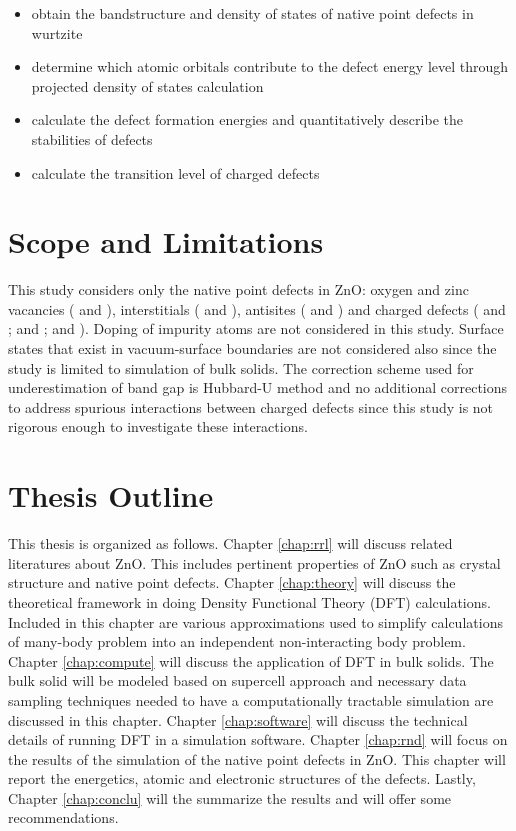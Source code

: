 \begin{itemize}
	\item obtain the bandstructure and density of states of native point defects in wurtzite 
	\item determine which atomic orbitals  contribute to the defect energy level through projected density of states calculation
	\item calculate the defect formation energies and quantitatively describe the stabilities of defects
	\item calculate the transition level of charged defects
\end{itemize}

\section{Scope and Limitations}
This study considers only the native point defects in ZnO: oxygen and zinc vacancies ( and ), interstitials ( and ), antisites ( and ) and charged defects ( and ;  and ;  and ). Doping of impurity atoms are not considered in this study. Surface states that exist in vacuum-surface boundaries are not considered also since the study is limited to simulation of bulk solids. The correction scheme used for underestimation of band gap is Hubbard-U method and no additional corrections to address spurious interactions between charged defects since this study is not rigorous enough to investigate these interactions.


\section{Thesis Outline}
This thesis is organized as follows. Chapter \ref{chap:rrl} will discuss related literatures about ZnO. This includes pertinent properties of ZnO such as crystal structure and native point defects. Chapter \ref{chap:theory} will discuss the theoretical framework in doing Density Functional Theory (DFT) calculations. Included in this chapter are various approximations used to simplify calculations of many-body problem into an independent non-interacting body problem. Chapter \ref{chap:compute} will discuss the application of DFT in bulk solids. The bulk solid will be modeled based on supercell approach and necessary data sampling techniques needed to have a computationally tractable simulation are discussed in this chapter. Chapter \ref{chap:software} will discuss the technical details of running DFT in a simulation software. Chapter \ref{chap:rnd} will focus on the results of the simulation of the native point defects in ZnO. This chapter will report the energetics, atomic and electronic structures of the defects. Lastly, Chapter \ref{chap:conclu} will the summarize the results and will offer some recommendations.

